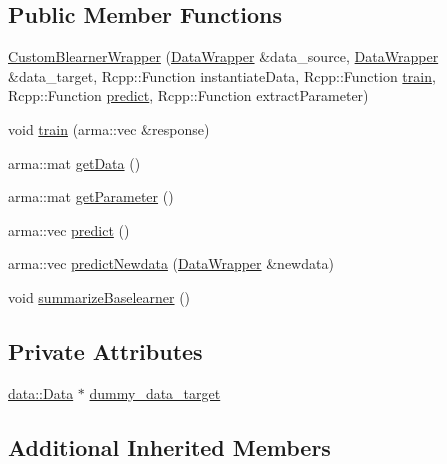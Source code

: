 \subsection*{Public Member Functions}
\begin{DoxyCompactItemize}
\item 
\mbox{\hyperlink{class_custom_blearner_wrapper_a2fd4bb5e6f0c8fb5cae69ef46a5e2db8}{Custom\+Blearner\+Wrapper}} (\mbox{\hyperlink{class_data_wrapper}{Data\+Wrapper}} \&data\+\_\+source, \mbox{\hyperlink{class_data_wrapper}{Data\+Wrapper}} \&data\+\_\+target, Rcpp\+::\+Function instantiate\+Data, Rcpp\+::\+Function \mbox{\hyperlink{class_custom_blearner_wrapper_a970f89e16f5dc5cfce1e1dc4461d34a5}{train}}, Rcpp\+::\+Function \mbox{\hyperlink{class_custom_blearner_wrapper_ac3c5d68400ea9473815ab2daed218473}{predict}}, Rcpp\+::\+Function extract\+Parameter)
\item 
void \mbox{\hyperlink{class_custom_blearner_wrapper_a970f89e16f5dc5cfce1e1dc4461d34a5}{train}} (arma\+::vec \&response)
\item 
arma\+::mat \mbox{\hyperlink{class_custom_blearner_wrapper_a3153378a0c0ee8c4633d42680195eeda}{get\+Data}} ()
\item 
arma\+::mat \mbox{\hyperlink{class_custom_blearner_wrapper_ae012429cb317fae84ab8028c76c2b70d}{get\+Parameter}} ()
\item 
arma\+::vec \mbox{\hyperlink{class_custom_blearner_wrapper_ac3c5d68400ea9473815ab2daed218473}{predict}} ()
\item 
arma\+::vec \mbox{\hyperlink{class_custom_blearner_wrapper_a0aba49ca5396f5bd09a745003436dd3f}{predict\+Newdata}} (\mbox{\hyperlink{class_data_wrapper}{Data\+Wrapper}} \&newdata)
\item 
void \mbox{\hyperlink{class_custom_blearner_wrapper_a61e82d619f07ba3e69fa4100be0ed1f2}{summarize\+Baselearner}} ()
\end{DoxyCompactItemize}
\subsection*{Private Attributes}
\begin{DoxyCompactItemize}
\item 
\mbox{\hyperlink{classdata_1_1_data}{data\+::\+Data}} $\ast$ \mbox{\hyperlink{class_custom_blearner_wrapper_af70b599670b5c64406e10b7bda9c0bb1}{dummy\+\_\+data\+\_\+target}}
\end{DoxyCompactItemize}
\subsection*{Additional Inherited Members}


